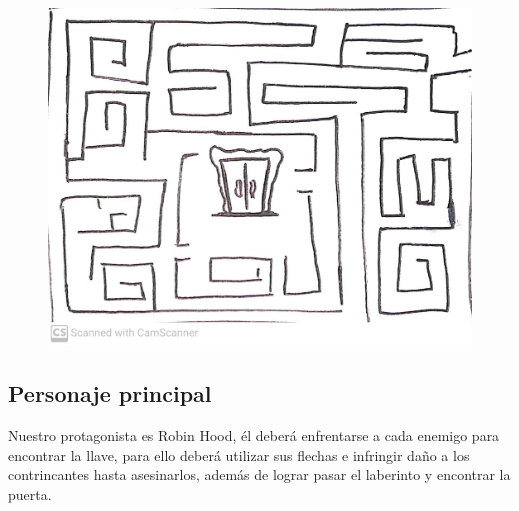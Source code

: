 \documentclass{article}
\begin{document}
\begin{figure}[h!]
    \centering
    \includegraphics[scale=0.2]{WhatsApp Image 2021-09-14 at 12.02.29 PM.jpeg}
\end{figure}

\newpage

\subsection{Personaje principal}
Nuestro protagonista es Robin Hood, él deberá enfrentarse a cada enemigo para encontrar la llave, para ello deberá utilizar sus flechas e infringir daño a los contrincantes hasta asesinarlos, además de lograr pasar el laberinto y encontrar la puerta.
\end{document}
